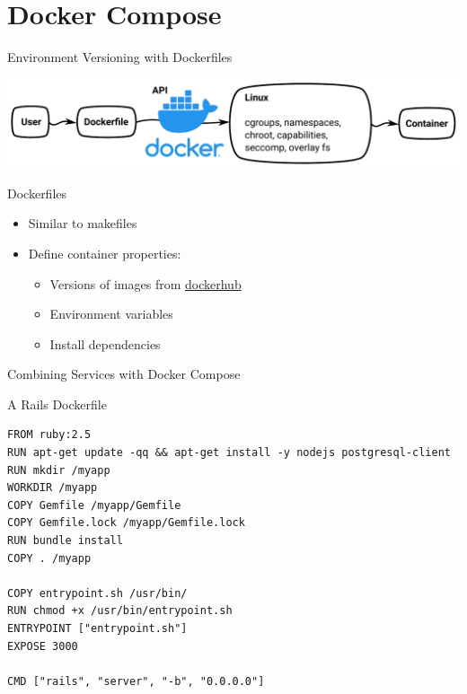 \documentclass[10pt, compress, aspectratio=169, xcolor={table,usenames,dvipsnames}]{beamer}
\begin{document}
\section{Docker Compose}
\label{sec:orgad4ee8d}
\begin{frame}[label={sec:org6a6156d}]{Environment Versioning with Dockerfiles}
\begin{center}
\includegraphics[width=.78\columnwidth]{../../img/virt_with_dockerfile.pdf}
\end{center}
\begin{block}{Dockerfiles}
\begin{itemize}
\item Similar to \alert{makefiles}
\item Define container \alert{properties}:
\begin{itemize}
\item Versions of images from \href{https://hub.docker.com/search?q=\&type=image}{dockerhub}
\item Environment variables
\item Install dependencies
\end{itemize}
\end{itemize}
\end{block}
\end{frame}
\begin{frame}[label={sec:orgf5abb8f},fragile]{Combining Services with Docker Compose}
 \begin{block}{A Rails Dockerfile}
\lstset{language=dockerfile,label= ,caption= ,captionpos=b,numbers=none}
\begin{lstlisting}
FROM ruby:2.5
RUN apt-get update -qq && apt-get install -y nodejs postgresql-client
RUN mkdir /myapp
WORKDIR /myapp
COPY Gemfile /myapp/Gemfile
COPY Gemfile.lock /myapp/Gemfile.lock
RUN bundle install
COPY . /myapp

COPY entrypoint.sh /usr/bin/
RUN chmod +x /usr/bin/entrypoint.sh
ENTRYPOINT ["entrypoint.sh"]
EXPOSE 3000

CMD ["rails", "server", "-b", "0.0.0.0"]
\end{lstlisting}
\end{block}
\end{frame}
\end{document}
